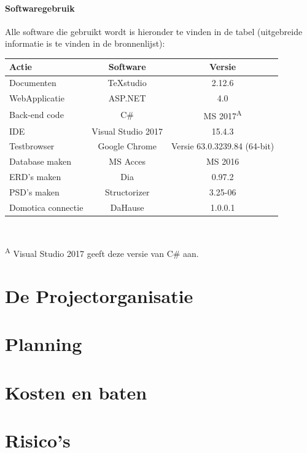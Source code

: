 \documentclass[11pt]{article}
\begin{document}
\paragraph{Softwaregebruik}
\begin{flushleft}
Alle software die gebruikt wordt is hieronder te vinden in de tabel (uitgebreide informatie is te vinden in de bronnenlijst):\\
\begin{tabular}[h]{l c c}
	Actie & Software & Versie\\ \hline
	Documenten & TeXstudio & 2.12.6\\ \hline 
	WebApplicatie & ASP.NET & 4.0\\ \hline
	Back-end code & C\# &  MS 2017\textsuperscript{A} \\ \hline
	IDE & Visual Studio 2017 & 15.4.3\\ \hline
	Testbrowser & Google Chrome & Versie 63.0.3239.84 (64-bit)\\ \hline
	Database maken & MS Acces & MS 2016\\ \hline
	ERD's maken & Dia & 0.97.2\\ \hline
	PSD's maken & Structorizer & 3.25-06\\ \hline
	Domotica connectie & DaHause & 1.0.0.1 \\ \hline
	
	\end{tabular}\\ 
\vspace{4mm}

\textsuperscript{A} Visual Studio 2017 geeft deze versie van C\# aan.
\end{flushleft}
\newpage
\section{De Projectorganisatie}
\newpage
\section{Planning}
\newpage
\section{Kosten en baten}
\newpage
\section{Risico's}
\newpage
\end{document}
